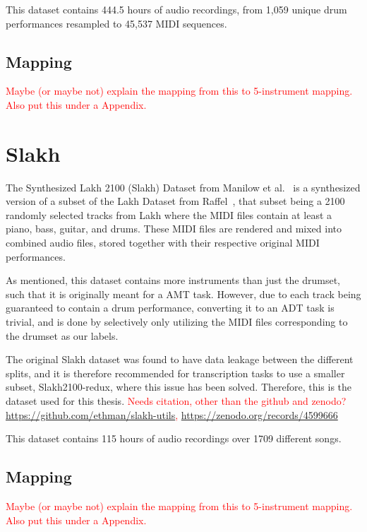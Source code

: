 This dataset contains 444.5 hours of audio recordings, from 1,059 unique drum performances resampled to 45,537 MIDI sequences.

\subsection{Mapping}

\textcolor{red}{Maybe (or maybe not) explain the mapping from this to 5-instrument mapping. Also put this under a Appendix.}

\section{Slakh}

The Synthesized Lakh 2100 (Slakh) Dataset from Manilow et al.~\cite{8937170} is a synthesized version of a subset of the Lakh Dataset from Raffel~\cite{raffel2016learning}, that subset being a 2100 randomly selected tracks from Lakh where the MIDI files contain at least a piano, bass, guitar, and drums. These MIDI files are rendered and mixed into combined audio files, stored together with their respective original MIDI performances.

As mentioned, this dataset contains more instruments than just the drumset, such that it is originally meant for a \gls{AMT} task. However, due to each track being guaranteed to contain a drum performance, converting it to an \gls{ADT} task is trivial, and is done by selectively only utilizing the MIDI files corresponding to the drumset as our labels.

The original Slakh dataset was found to have data leakage between the different splits, and it is therefore recommended for transcription tasks to use a smaller subset, Slakh2100-redux, where this issue has been solved. Therefore, this is the dataset used for this thesis.
\textcolor{red}{Needs citation, other than the github and zenodo? \\ \url{https://github.com/ethman/slakh-utils}, \url{https://zenodo.org/records/4599666}}

This dataset contains 115 hours of audio recordings over 1709 different songs.

\subsection{Mapping}

\textcolor{red}{Maybe (or maybe not) explain the mapping from this to 5-instrument mapping. Also put this under a Appendix.}

